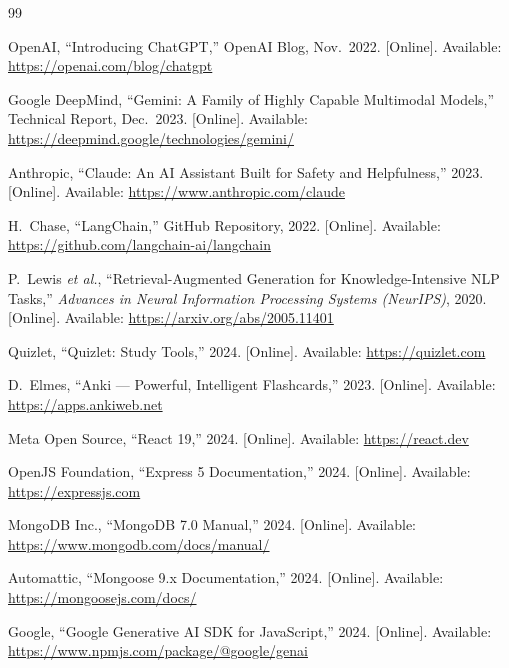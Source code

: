 \documentclass[12pt,a4paper]{report}
\begin{document}

\begin{thebibliography}{99}

OpenAI, ``Introducing ChatGPT,'' OpenAI Blog, Nov.\ 2022.
[Online]. Available: \url{https://openai.com/blog/chatgpt}

Google DeepMind, ``Gemini: A Family of Highly Capable Multimodal Models,''
Technical Report, Dec.\ 2023.
[Online]. Available: \url{https://deepmind.google/technologies/gemini/}

Anthropic, ``Claude: An AI Assistant Built for Safety and Helpfulness,''
2023. [Online]. Available: \url{https://www.anthropic.com/claude}

H.\ Chase, ``LangChain,'' GitHub Repository, 2022.
[Online]. Available: \url{https://github.com/langchain-ai/langchain}

P.\ Lewis \textit{et al.}, ``Retrieval-Augmented Generation for Knowledge-Intensive NLP Tasks,''
\textit{Advances in Neural Information Processing Systems (NeurIPS)}, 2020.
[Online]. Available: \url{https://arxiv.org/abs/2005.11401}

Quizlet, ``Quizlet: Study Tools,'' 2024.
[Online]. Available: \url{https://quizlet.com}

D.\ Elmes, ``Anki — Powerful, Intelligent Flashcards,''
2023. [Online]. Available: \url{https://apps.ankiweb.net}

Meta Open Source, ``React 19,'' 2024.
[Online]. Available: \url{https://react.dev}

OpenJS Foundation, ``Express 5 Documentation,''
2024. [Online]. Available: \url{https://expressjs.com}

MongoDB Inc., ``MongoDB 7.0 Manual,''
2024. [Online]. Available: \url{https://www.mongodb.com/docs/manual/}

Automattic, ``Mongoose 9.x Documentation,''
2024. [Online]. Available: \url{https://mongoosejs.com/docs/}

Google, ``Google Generative AI SDK for JavaScript,''
2024. [Online]. Available: \url{https://www.npmjs.com/package/@google/genai}

\end{thebibliography}
\end{document}
